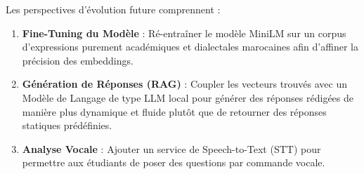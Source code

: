 \documentclass[11pt,a4paper]{article}
\begin{document}
Les perspectives d'évolution future comprennent :
\begin{enumerate}
    \item \textbf{Fine-Tuning du Modèle} : Ré-entraîner le modèle MiniLM sur un corpus d'expressions purement académiques et dialectales marocaines afin d'affiner la précision des embeddings.
    \item \textbf{Génération de Réponses (RAG)} : Coupler les vecteurs trouvés avec un Modèle de Langage de type LLM local pour générer des réponses rédigées de manière plus dynamique et fluide plutôt que de retourner des réponses statiques prédéfinies.
    \item \textbf{Analyse Vocale} : Ajouter un service de Speech-to-Text (STT) pour permettre aux étudiants de poser des questions par commande vocale.
\end{enumerate}
\end{document}
